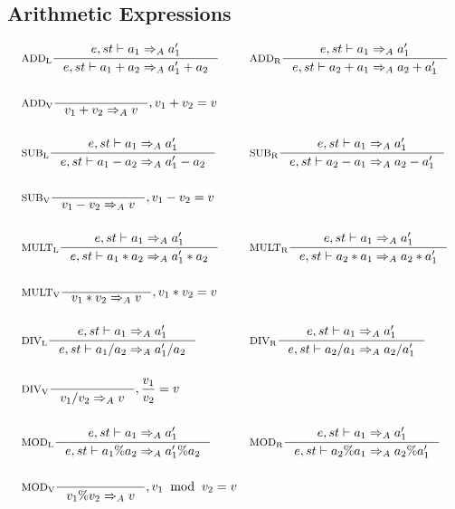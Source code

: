 \subsection{Arithmetic Expressions}
\begin{align*}
&\inference[$\text{ADD}_\text{L}$]{e,st \vdash a_1 \Rightarrow_A a_1'}
                    {e,st \vdash  a_1 + a_2 \Rightarrow_A a_1' + a_2}
&
&\inference[$\text{ADD}_\text{R}$]{e,st \vdash a_1 \Rightarrow_A a_1'}
										{e,st \vdash a_2 + a_1 \Rightarrow_A a_2 + a_1'}
\\\\
&\inference[$\text{ADD}_\text{V}$]{}
                    {v_1 + v_2 \Rightarrow_A v}
										{, v_1 + v_2 = v}
\\\\
&\inference[$\text{SUB}_\text{L}$]{e,st \vdash a_1 \Rightarrow_A a_1'}
                    {e,st \vdash a_1 - a_2 \Rightarrow_A a_1' - a_2}
&
&\inference[$\text{SUB}_\text{R}$]{e,st \vdash a_1 \Rightarrow_A a_1'}
                    {e,st \vdash a_2 - a_1 \Rightarrow_A a_2 - a_1'}
\\\\
&\inference[$\text{SUB}_\text{V}$]{}
                    {v_1 - v_2 \Rightarrow_A v}
										{, v_1 - v_2 = v}
\\\\
&\inference[$\text{MULT}_\text{L}$]{e,st \vdash a_1 \Rightarrow_A a_1'}
                     {e,st \vdash a_1 * a_2 \Rightarrow_A a_1' * a_2}
&
&\inference[$\text{MULT}_\text{R}$]{e,st \vdash a_1 \Rightarrow_A a_1'}
                     {e,st \vdash a_2 * a_1 \Rightarrow_A a_2 * a_1'}
\\\\
&\inference[$\text{MULT}_\text{V}$]{}
                     {v_1 * v_2 \Rightarrow_A v}
										 {, v_1 * v_2 = v}
\\\\
&\inference[$\text{DIV}_\text{L}$]{e,st \vdash a_1 \Rightarrow_A a_1'}
                    {e,st \vdash a_1 / a_2 \Rightarrow_A a_1' / a_2}
&
&\inference[$\text{DIV}_\text{R}$]{e,st \vdash a_1 \Rightarrow_A a_1'}
                    {e,st \vdash a_2 / a_1 \Rightarrow_A a_2 / a_1'}
\\\\
&\inference[$\text{DIV}_\text{V}$]{}
                    {v_1 / v_2 \Rightarrow_A v}
										{, \frac{v_1}{v_2} = v}
\\\\
&\inference[$\text{MOD}_\text{L}$]{e,st \vdash a_1 \Rightarrow_A a_1'}
                    {e,st \vdash a_1 \% a_2 \Rightarrow_A a_1' \% a_2}
&
&\inference[$\text{MOD}_\text{R}$]{e,st \vdash a_1 \Rightarrow_A a_1'}
                    {e,st \vdash a_2 \% a_1 \Rightarrow_A a_2 \% a_1'}
\\\\
&\inference[$\text{MOD}_\text{V}$]{}
                    {v_1 \% v_2 \Rightarrow_A v}
										{, v_1 \;\; \textrm{mod} \;\; v_2 = v}
\end{align*}
